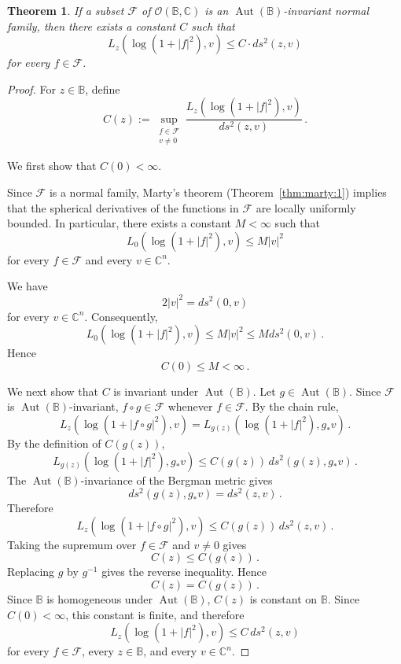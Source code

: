 \documentclass[pdflatex]{sn-jnl}%
\newtheorem{thm}{Theorem}[section]
\theoremstyle{definition}
\theoremstyle{remark}
\numberwithin{equation}{section}
\newcommand{\C}{\mathbb{C}}
\begin{document}
    \begin{thm}
        \label{thm:norm-manif-1}
        If a subset $\mathcal{F}$ of $\mathcal{O}(\mathbb{B}, \C)$ is an $\operatorname{Aut}(\mathbb{B})$-invariant normal family, then there exists a constant $C$ such that
        \begin{equation}
            L_z(\log(1+|f|^2),v)\leq C \cdot ds^2(z,v)
            \label{eq:norm-inequality}
        \end{equation}
        for every $f \in \mathcal{F}$.
    \end{thm}

    \begin{proof}
        For $z\in\mathbb{B}$, define
        \[
            C(z) := \sup_{\substack{f\in\mathcal{F}\\v\ne0}}\frac{ L_z\left(\log(1+|f|^2),v\right) }{ ds^2(z,v) }\,.
        \]

        We first show that $C(0)<\infty$.

        Since $\mathcal{F}$ is a normal family, Marty's theorem (Theorem~\ref{thm:marty:1}) implies that the spherical derivatives of the functions in $\mathcal{F}$ are locally uniformly bounded.
        In particular, there exists a constant $M<\infty$ such that
        \[
            L_0\left(\log(1+|f|^2),v\right)\leq M|v|^2
        \]
        for every $f\in\mathcal{F}$ and every $v\in\C^n$.

        We have
        \[
            2|v|^2=ds^2(0,v)
        \]
        for every $v\in\C^n$.
        Consequently,
        \[
            L_0\left(\log(1+|f|^2),v\right) \leq M|v|^2\leq Mds^2(0,v)\,.
        \]
        Hence
        \[
            C(0)\leq M<\infty\,.
        \]

        We next show that $C$ is invariant under $\operatorname{Aut}(\mathbb{B})$.
        Let $g\in\operatorname{Aut}(\mathbb{B})$.
        Since $\mathcal{F}$ is $\operatorname{Aut}(\mathbb{B})$-invariant, $f\circ g\in\mathcal{F}$ whenever $f\in\mathcal{F}$.
        By the chain rule,
        \[
            L_z\left(\log(1+|f\circ g|^2),v\right) = L_{g(z)}\left(\log(1+|f|^2),g_{*}v\right)\,.
        \]
        By the definition of $C(g(z))$,
        \[
            L_{g(z)}\left(\log(1+|f|^2),g_{*}v\right) \leq C(g(z))\,ds^2(g(z),g_{*}v)\,.
        \]
        The $\operatorname{Aut}(\mathbb{B})$-invariance of the Bergman metric gives
        \[
            ds^2(g(z),g_{*}v)=ds^2(z,v)\,.
        \]
        Therefore
        \[
            L_z\left(\log(1+|f\circ g|^2),v\right) \leq C(g(z))\,ds^2(z,v)\,.
        \]
        Taking the supremum over $f\in\mathcal{F}$ and $v\neq0$ gives
        \[
            C(z)\leq C(g(z))\,.
        \]
        Replacing $g$ by $g^{-1}$ gives the reverse inequality.
        Hence
        \[
            C(z)=C(g(z))\,.
        \]
        Since $\mathbb{B}$ is homogeneous under $\operatorname{Aut}(\mathbb{B})$, $C(z)$ is constant on $\mathbb{B}$.
        Since $C(0)<\infty$, this constant is finite, and therefore
        \[
            L_z\left(\log(1+|f|^2),v\right) \leq C\,ds^2(z,v)
        \]
        for every $f\in\mathcal{F}$, every $z\in\mathbb{B}$, and every $v\in\C^n$.
    \end{proof}
\end{document}
